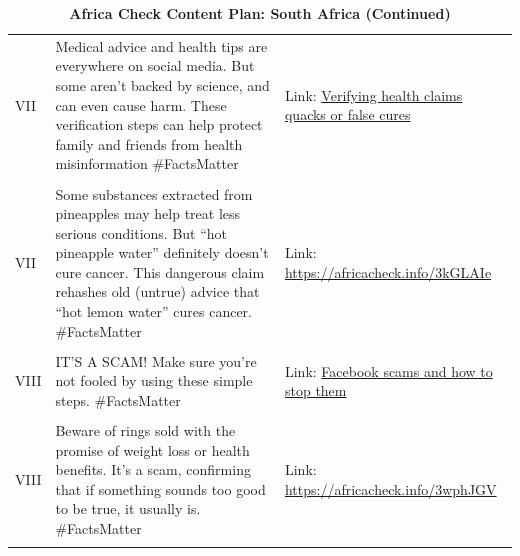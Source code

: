   
	\begin{table}[ht]
		\centering
  \caption{\textbf{Africa Check Content Plan: South Africa (Continued)} \label{tab:SA_3}}
		\begin{tabular}{|p{1cm}|p{7cm}|p{5cm}|}
			\hline
   VII & Medical advice and health tips are everywhere on social media. But some aren’t backed by science, and can even cause harm. These verification steps can help protect family and friends from health
misinformation
 \#FactsMatter & Link: \href{https://www.dropbox.com/s/b2bxkbjwtzp2xnr/Africa_Check_health.mp4?dl=0}{Verifying health claims quacks or false cures} \\ &  &\\
 VII & Some substances extracted from pineapples may help treat less serious conditions. But “hot pineapple water” definitely doesn’t cure cancer. This dangerous claim rehashes old (untrue) advice that “hot lemon water” cures cancer.
  \#FactsMatter & Link: \url{https://africacheck.info/3kGLAIe} \\ &  &\\
 VIII & IT'S A SCAM! Make sure you're not fooled by using these simple steps.
 \#FactsMatter & Link: \href{https://www.dropbox.com/s/9gvyb2x4j09thiv/Africa_Check_facebook.mp4?dl=0}{Facebook scams and how to stop them} \\ &  &\\
 VIII & Beware of rings sold with the promise of weight loss or health benefits. It’s a scam, confirming that if something sounds too good to be true, it usually is.
  \#FactsMatter
 & Link: \url{https://africacheck.info/3wphJGV} \\ &  &\\
\hline 
   \end{tabular}
\end{table}
